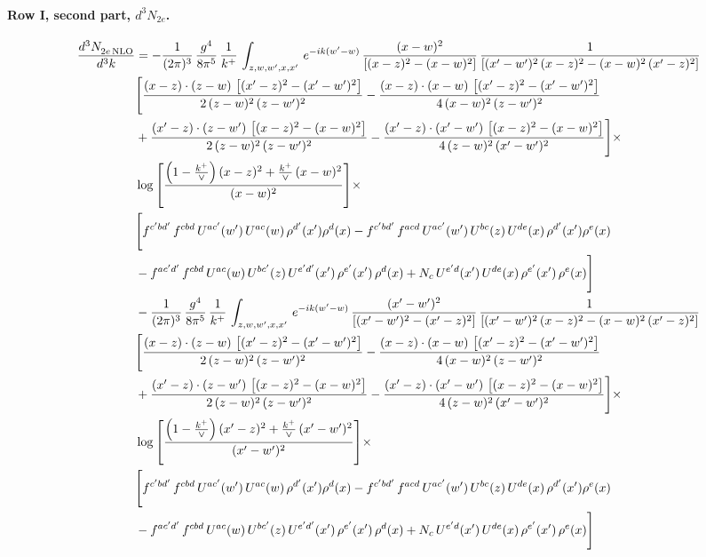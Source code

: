 \documentclass[10pt]{article}
\numberwithin{equation}{section}
\begin{document}
\paragraph{Row I, second part, $d^3N_{2e}$.}
\begin{align}
 \frac{d^{3}N_{2e\,\rm NLO}^{\rm}}{d^{3}k}  & =   -\frac{1}{(2\pi)^{3}}\, \frac{g^{4}}{8\pi^{5}}\,\frac{1}{k^{+}}\,\int_{z,w,w^{\prime},x,x'}\, e^{-ik(w^{\prime}-w)}\,\frac{(x-w)^{2}}{\left[(x-z)^{2}-(x-w)^{2}\right]}\, \frac{1}{\left[(x'-w')^{2}\, (x-z)^{2} - (x-w)^{2}\, (x'-z)^{2}\right]} \notag \\ & \Bigg[\frac{(x-z)\cdot (z-w)\, \left[(x'-z)^{2}-(x'-w')^{2}\right]}{2\, (z-w)^{2}\, (z-w')^{2}}  - \frac{(x-z)\cdot (x-w)\,\left[(x'-z)^{2}-(x'-w')^{2}\right] }{4\,(x-w)^{2}\,(z-w')^{2}}\notag \\ & +\frac{(x'-z)\cdot (z-w')\, \left[(x-z)^{2}-(x-w)^{2}\right]}{2\, (z-w)^{2}\, (z-w')^{2}}-\frac{(x'-z)\cdot (x'-w')\, \left[(x-z)^{2}-(x-w)^{2}\right]}{4\, (z-w)^{2}\,(x'-w')^{2}}\Bigg]\times\,\notag \\ & \log{\left[\frac{\left(1-\frac{k^{+}}{\vee}\right)(x-z)^{2}+\frac{k^{+}}{\vee}\,(x-w)^{2}}{(x-w)^{2}}\right]}\times\,\notag \\ & \Bigg[f^{c'bd'}\,f^{cbd}\, U^{ac'}(w')\,U^{ac}(w)\,\rho^{d'}(x')\rho^{d}(x)- f^{c'bd'}\,f^{acd}\,U^{ac'}(w')\,U^{bc}(z)\,U^{de}(x)\,\rho^{d'}(x')\rho^{e}(x) \notag \\ & -f^{ac'd'}\,f^{cbd}\,U^{ac}(w)\,U^{bc'}(z)\,U^{e'd'}(x')\,\rho^{e'}(x')\,\rho^{d}(x) +N_{c}\,U^{e'd}(x')\,U^{de}(x)\,\rho^{e'}(x')\,\rho^{e}(x)\Bigg] \notag \\
& -\frac{1}{(2\pi)^{3}}\, \frac{g^{4}}{8\pi^{5}}\,\frac{1}{k^{+}}\,\int_{z,w,w^{\prime},x,x'}\, e^{-ik(w^{\prime}-w)}\, \frac{(x'-w')^{2}}{\left[(x'-w')^{2}-(x'-z)^{2}\right]}\, \frac{1}{\left[(x'-w')^{2}\, (x-z)^{2} - (x-w)^{2}\, (x'-z)^{2}\right]}  \notag \\ & \Bigg[\frac{(x-z)\cdot (z-w)\, \left[(x'-z)^{2}-(x'-w')^{2}\right]}{2\, (z-w)^{2}\, (z-w')^{2}}  - \frac{(x-z)\cdot (x-w)\,\left[(x'-z)^{2}-(x'-w')^{2}\right] }{4\,(x-w)^{2}\,(z-w')^{2}}\notag \\ & +\frac{(x'-z)\cdot (z-w')\, \left[(x-z)^{2}-(x-w)^{2}\right]}{2\, (z-w)^{2}\, (z-w')^{2}}-\frac{(x'-z)\cdot (x'-w')\, \left[(x-z)^{2}-(x-w)^{2}\right]}{4\, (z-w)^{2}\,(x'-w')^{2}}\Bigg]\times\,\notag \\ & \log{\left[\frac{\left(1-\frac{k^{+}}{\vee}\right)(x'-z)^{2}+\frac{k^{+}}{\vee}\,(x'-w')^{2}}{(x'-w')^{2}}\right]}\times\notag \\ & \Bigg[f^{c'bd'}\,f^{cbd}\, U^{ac'}(w')\,U^{ac}(w)\,\rho^{d'}(x')\rho^{d}(x)- f^{c'bd'}\,f^{acd}\,U^{ac'}(w')\,U^{bc}(z)\,U^{de}(x)\,\rho^{d'}(x')\rho^{e}(x) \notag \\ & -f^{ac'd'}\,f^{cbd}\,U^{ac}(w)\,U^{bc'}(z)\,U^{e'd'}(x')\,\rho^{e'}(x')\,\rho^{d}(x) +N_{c}\,U^{e'd}(x')\,U^{de}(x)\,\rho^{e'}(x')\,\rho^{e}(x)\Bigg] \label{eq:F:G2I2e}
\end{align}
\end{document}
